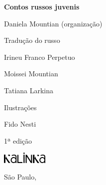 




\begingroup\thispagestyle{empty}\parindent0pt%

              \Huge 
              \textbf{Contos russos juvenis}
              \vspace{2em}

  					  \large
              {\textmdbf Daniela Mountian (organização)}
              \vspace{2em}

              \normalsize  
              {\textmdbf Tradução do russo}

              Irineu Franco Perpetuo

              Moissei Mountian

              Tatiana Larkina

              \bigskip

              {\textmdbf Ilustrações}

              Fido Nesti

              \vfill

              \begin{center}
              1ª edição

              \smallskip

              \includegraphics[width=2.2cm]{./logo.jpg}

              São Paulo, \the\year
              \end{center}
\endgroup
\pagebreak
